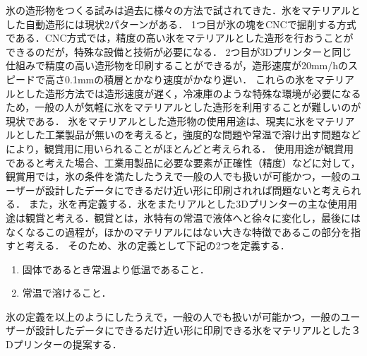 氷の造形物をつくる試みは過去に様々の方法で試されてきた．氷をマテリアルとした自動造形には現状2パターンがある．
1つ目が氷の塊をCNCで掘削する方式である．CNC方式では，精度の高い氷をマテリアルとした造形を行おうことができるのだが，特殊な設備と技術が必要になる．
2つ目が3Dプリンターと同じ仕組みで精度の高い造形物を印刷することができるが，造形速度が20mm/hのスピードで高さ0.1mmの積層とかなり速度がかなり遅い．
これらの氷をマテリアルとした造形方法では造形速度が遅く，冷凍庫のような特殊な環境が必要になるため，一般の人が気軽に氷をマテリアルとした造形を利用することが難しいのが現状である．
氷をマテリアルとした造形物の使用用途は、現実に氷をマテリアルとした工業製品が無いのを考えると，強度的な問題や常温で溶け出す問題などにより，観賞用に用いられることがほとんどと考えられる．
使用用途が観賞用であると考えた場合、工業用製品に必要な要素が正確性（精度）などに対して，観賞用では，氷の条件を満たしたうえで一般の人でも扱いが可能かつ，一般のユーザーが設計したデータにできるだけ近い形に印刷されれば問題ないと考えられる．
また，氷を再定義する．氷をまたリアルとした3Dプリンターの主な使用用途は観賞と考える．観賞とは，氷特有の常温で液体へと徐々に変化し，最後にはなくなるこの過程が，ほかのマテリアルにはない大きな特徴であるこの部分を指すと考える．
そのため、氷の定義として下記の2つを定義する．

\begin{enumerate}
  \item 固体であるとき常温より低温であること． 
  \item 常温で溶けること．
 \end{enumerate}

氷の定義を以上のようにしたうえで，一般の人でも扱いが可能かつ，一般のユーザーが設計したデータにできるだけ近い形に印刷できる氷をマテリアルとした３Dプリンターの提案する．




